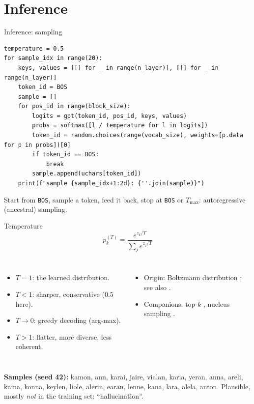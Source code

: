 \documentclass[aspectratio=169,11pt]{beamer}
\begin{document}
\section{Inference}
\begin{frame}[fragile]{Inference: sampling}
\begin{lstlisting}
temperature = 0.5
for sample_idx in range(20):
    keys, values = [[] for _ in range(n_layer)], [[] for _ in range(n_layer)]
    token_id = BOS
    sample = []
    for pos_id in range(block_size):
        logits = gpt(token_id, pos_id, keys, values)
        probs = softmax([l / temperature for l in logits])
        token_id = random.choices(range(vocab_size), weights=[p.data for p in probs])[0]
        if token_id == BOS:
            break
        sample.append(uchars[token_id])
    print(f"sample {sample_idx+1:2d}: {''.join(sample)}")
\end{lstlisting}
Start from \texttt{BOS}, sample a token, feed it back, stop at \texttt{BOS} or $T_{\max}$: autoregressive (ancestral) sampling.
\end{frame}

\begin{frame}{Temperature}
\small\vspace{-8pt}
\[
p^{(T)}_k = \frac{e^{z_k/T}}{\sum_j e^{z_j/T}}
\]
\begin{columns}
\begin{itemize}
  \item $T=1$: the learned distribution.
  \item $T<1$: sharper, conservative ($0.5$ here).
  \item $T\to 0$: greedy decoding (arg-max).
  \item $T>1$: flatter, more diverse, less coherent.
\end{itemize}
\begin{itemize}
  \item Origin: Boltzmann distribution \parencite{ackley1985boltzmann}; see also \textcite{hinton2015distilling}.
  \item Companions: top-$k$ \parencite{fan2018hierarchical}, nucleus sampling \parencite{holtzman2020nucleus}.
\end{itemize}
\end{columns}
\vspace{4pt}
{\small\textbf{Samples (seed 42):} kamon, ann, karai, jaire, vialan, karia, yeran, anna, areli, kaina, konna, keylen, liole, alerin, earan, lenne, kana, lara, alela, anton. Plausible, mostly \emph{not} in the training set: ``hallucination''.}
\end{frame}
\end{document}

